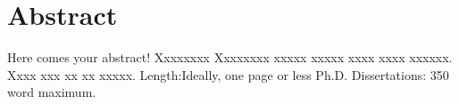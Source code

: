 \doublespacing
\chapter*{Abstract}
\abstract{}
 Here comes your abstract! Xxxxxxxx Xxxxxxxx xxxxx xxxxx xxxx xxxx xxxxxx. Xxxx xxx xx xx xxxxx. Length:Ideally, one page or less Ph.D. Dissertations: 350 word maximum.

